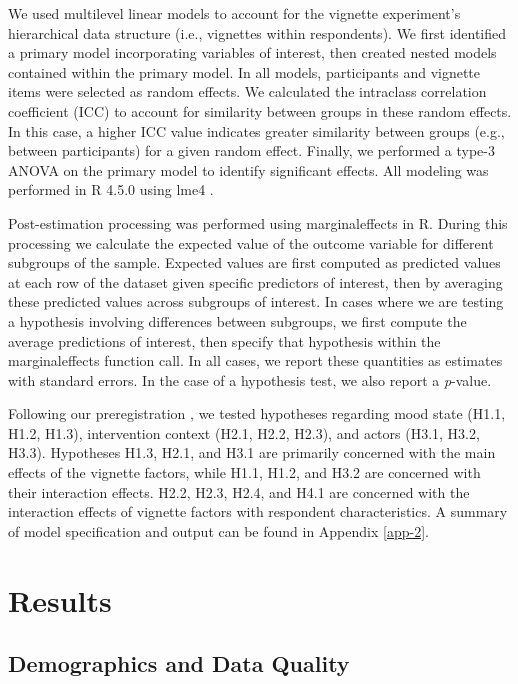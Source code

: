 \documentclass[10pt]{article}
\begin{document}
We used multilevel linear models \cite{gelmanData2007} to account for the vignette experiment’s hierarchical data structure (i.e., vignettes within respondents). We first identified a primary model incorporating variables of interest, then created nested models contained within the primary model. In all models, participants and vignette items were selected as random effects. We calculated the intraclass correlation coefficient (ICC) to account for similarity between groups in these random effects. In this case, a higher ICC value indicates greater similarity between groups (e.g., between participants) for a given random effect. Finally, we performed a type-3 ANOVA on the primary model to identify significant effects. All modeling was performed in R 4.5.0 using {lme4} \cite{bateslme42025}. 

Post-estimation processing was performed using {marginaleffects} \cite{arel-bundockhow2024} in R. During this processing we calculate the expected value of the outcome variable for different subgroups of the sample. Expected values are first computed as predicted values at each row of the dataset given specific predictors of interest, then by averaging these predicted values across subgroups of interest. In cases where we are testing a hypothesis involving differences between subgroups, we first compute the average predictions of interest, then specify that hypothesis within the {marginaleffects} function call. In all cases, we report these quantities as estimates with standard errors. In the case of a hypothesis test, we also report a \textit{p}-value.

Following our preregistration \cite{brozenaidentifying2023}, we tested hypotheses regarding mood state (H1.1, H1.2, H1.3), intervention context (H2.1, H2.2, H2.3), and actors (H3.1, H3.2, H3.3). Hypotheses H1.3, H2.1, and H3.1 are primarily concerned with the main effects of the vignette factors, while H1.1, H1.2, and H3.2 are concerned with their interaction effects. H2.2, H2.3, H2.4, and H4.1 are concerned with the interaction effects of vignette factors with respondent characteristics. A summary of model specification and output can be found in Appendix \ref{app-2}.

\section{Results}

\subsection{Demographics and Data Quality}
\end{document}
